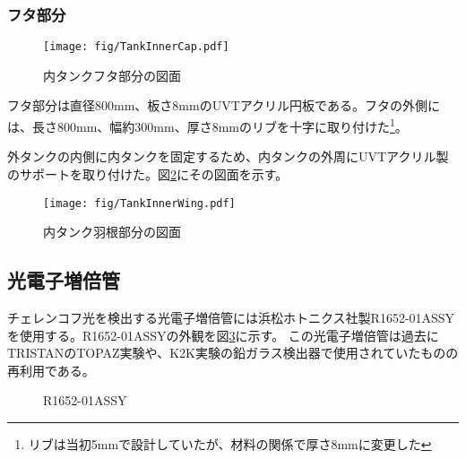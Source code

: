 \documentclass[11pt]{ltjsreport}
\newcommand{\figref}[1]{図\ref{#1}}
\begin{document}
\subsubsection{フタ部分}
\begin{figure}[htbp]
\centering
\texttt{[image: fig/TankInnerCap.pdf]}
\caption[内タンクフタ部分の図面]{内タンクフタ部分の図面}
\label{TankInnerCap}
\end{figure}

フタ部分は直径800mm、板さ8mmのUVTアクリル円板である。フタの外側には、長さ800mm、幅約300mm、厚さ8mmのリブを十字に取り付けた\footnote{リブは当初5mmで設計していたが、材料の関係で厚さ8mmに変更した}。

外タンクの内側に内タンクを固定するため、内タンクの外周にUVTアクリル製のサポートを取り付けた。\figref{TankInnerWing}にその図面を示す。
\begin{figure}[htb]
\centering
\texttt{[image: fig/TankInnerWing.pdf]}
\caption[内タンク羽根部分の図面]{内タンク羽根部分の図面}
\label{TankInnerWing}
\end{figure}
\fi%


\newpage
\subsection{光電子増倍管}
\label{PhotoTube}
チェレンコフ光を検出する光電子増倍管には浜松ホトニクス社製R1652-01ASSYを使用する。R1652-01ASSYの外観を\figref{LGPMT}に示す。
この光電子増倍管は過去にTRISTANのTOPAZ実験や、K2K実験の鉛ガラス検出器で使用されていたものの再利用である。

\begin{figure}[htbp]
  \begin{minipage}{0.47\textwidth}
  \end{minipage}
  \hfill
  \begin{minipage}{0.47\textwidth}
  \end{minipage}
    \caption{R1652-01ASSY}
  \label{LGPMT}
\end{figure}
\end{document}
